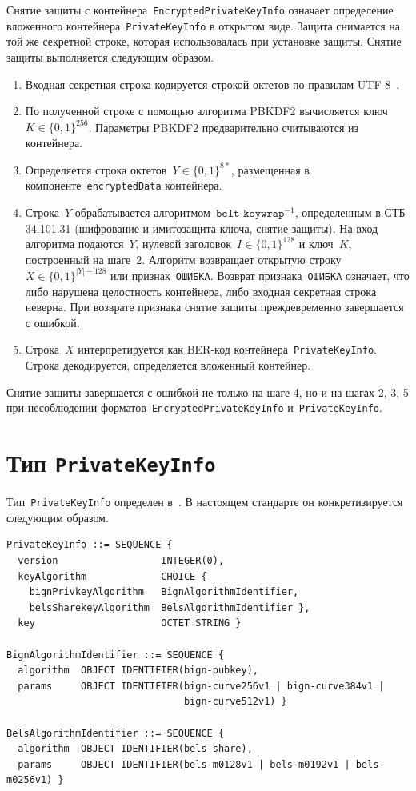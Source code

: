 Снятие защиты с контейнера~\texttt{EncryptedPrivateKeyInfo} 
означает определение вложенного контейнера~\texttt{PrivateKeyInfo} 
в открытом виде. Защита снимается на той же секретной строке, которая 
использовалась при установке защиты. 
Снятие защиты выполняется следующим образом.
\begin{enumerate}
\item
Входная секретная строка кодируется строкой октетов по правилам  
UTF-8~\cite{UTF8}. 
\item
По полученной строке с помощью алгоритма PBKDF2
вычисляется ключ~$K\in\{0,1\}^{256}$.
Параметры PBKDF2 предварительно считываются из контейнера.
\item
Определяется строка октетов~$Y\in\{0,1\}^{8*}$, размещенная в 
компоненте~\texttt{encryptedData} контейнера. 
\item
Строка~$Y$ обрабатывается алгоритмом~$\texttt{belt-keywrap}^{-1}$, определенным 
в СТБ 34.101.31 (шифрование и имитозащита ключа, снятие защиты). 
На вход алгоритма подаются~$Y$, нулевой заголовок~$I\in\{0,1\}^{128}$ и 
ключ~$K$, построенный на шаге~$2$. 
%
Алгоритм возвращает открытую строку~$X\in\{0,1\}^{|Y|-128}$ или 
признак~\texttt{ОШИБКА}.
%
Возврат признака~\texttt{ОШИБКА} означает, что либо нарушена целостность
контейнера, либо входная секретная строка неверна. При возврате признака
снятие защиты преждевременно завершается с ошибкой.
\item
Строка~$X$ интерпретируется как BER-код 
контейнера~\texttt{PrivateKeyInfo}. Строка декодируется, определяется 
вложенный контейнер. 
\end{enumerate}

Снятие защиты завершается с ошибкой не только на шаге 4, но и на 
шагах 2, 3, 5 при несоблюдении форматов~\texttt{EncryptedPrivateKeyInfo} 
и~\texttt{PrivateKeyInfo}. 

\section{Тип \texttt{PrivateKeyInfo}}\label{CONT.PT}

Тип~\texttt{PrivateKeyInfo} определен в~\cite{PKCS8}.
В настоящем стандарте он конкретизируется следующим образом.

\begin{verbatim}
PrivateKeyInfo ::= SEQUENCE {
  version                  INTEGER(0),
  keyAlgorithm             CHOICE {
    bignPrivkeyAlgorithm   BignAlgorithmIdentifier,
    belsSharekeyAlgorithm  BelsAlgorithmIdentifier },
  key                      OCTET STRING }

BignAlgorithmIdentifier ::= SEQUENCE {
  algorithm  OBJECT IDENTIFIER(bign-pubkey),
  params     OBJECT IDENTIFIER(bign-curve256v1 | bign-curve384v1 | 
                               bign-curve512v1) }

BelsAlgorithmIdentifier ::= SEQUENCE {
  algorithm  OBJECT IDENTIFIER(bels-share),
  params     OBJECT IDENTIFIER(bels-m0128v1 | bels-m0192v1 | bels-m0256v1) }
\end{verbatim}


